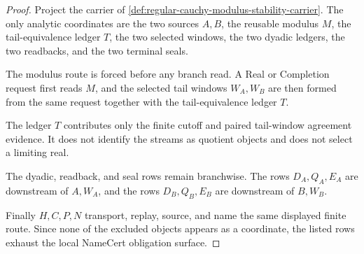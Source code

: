 \begin{proof}
Project the carrier of \autoref{def:regular-cauchy-modulus-stability-carrier}. The only analytic coordinates are the two sources $A,B$, the reusable modulus $M$, the tail-equivalence ledger $T$, the two selected windows, the two dyadic ledgers, the two readbacks, and the two terminal seals.

The modulus route is forced before any branch read. A Real or Completion request first reads $M$, and the selected tail windows $W_A,W_B$ are then formed from the same request together with the tail-equivalence ledger $T$.

The ledger $T$ contributes only the finite cutoff and paired tail-window agreement evidence. It does not identify the streams as quotient objects and does not select a limiting real.

The dyadic, readback, and seal rows remain branchwise. The rows $D_A,Q_A,E_A$ are downstream of $A,W_A$, and the rows $D_B,Q_B,E_B$ are downstream of $B,W_B$.

Finally $H,C,P,N$ transport, replay, source, and name the same displayed finite route. Since none of the excluded objects appears as a coordinate, the listed rows exhaust the local NameCert obligation surface.
\end{proof}

